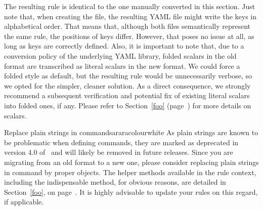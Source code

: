 
The resulting rule is identical to the one manually converted in this section. Just note that, when creating the file, the resulting YAML file might write the keys in alphabetical order. That means that, although both files semantically represent the same rule, the positions of keys differ. However, that poses no issue at all, as long as keys are correctly defined. Also, it is important to note that, due to a conversion policy of the underlying YAML library, folded scalars in the old format are transcribed as literal scalars in the new format. We could force a folded style as default, but the resulting rule would be unnecessarily verbose, so we opted for the simpler, cleaner solution. As a direct consequence, we strongly recommend a subsequent verification and potential fix of existing literal scalars into folded ones, if any. Please refer to Section~\ref{foo} (page~\pageref{foo}) for more details on scalars.

\begin{messagebox}{Replace plain strings in commands}{araracolour}{\icattention}{white}
As plain strings are known to be problematic when defining commands, they are marked as deprecated in version 4.0 of \arara\ and will likely be removed in future releases. Since you are migrating from an old format to a new one, please consider replacing plain strings in command by proper  objects. The helper methods available in the rule context, including the indispensable  method, for obvious reasons, are detailed in Section~\ref{foo}, on page~\pageref{foo}. It is highly advisable to update your rules on this regard, if applicable.
\end{messagebox}

